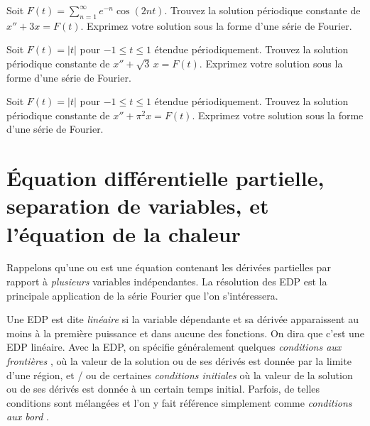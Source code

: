 \begin{exercise}
Soit $F(t) = \sum_{n=1}^\infty e^{-n} \cos(2 n t)$.
Trouvez la solution périodique constante de $x'' + 3 x = F(t)$.
Exprimez votre solution sous la forme d'une série de Fourier.
\end{exercise}

\begin{exercise}
Soit $F(t) = \lvert t \rvert$ pour $-1 \leq t \leq 1$ étendue périodiquement.
Trouvez la solution périodique constante de $x'' + \sqrt{3}\, x = F(t)$.
Exprimez votre solution sous la forme d'une série de Fourier.
\end{exercise}

\begin{exercise}
Soit $F(t) = \lvert t \rvert$ pour $-1 \leq t \leq 1$ étendue périodiquement.
Trouvez la solution périodique constante de $x'' + \pi^2 x = F(t)$.
Exprimez votre solution sous la forme d'une série de Fourier.
\end{exercise}



\sectionnewpage
\section{Équation différentielle partielle, separation de variables, et l'équation de la chaleur}
\label{heateq:section}


Rappelons qu'une \emph{} ou
\emph{} est une équation contenant les dérivées partielles
par rapport à \emph{plusieurs} variables indépendantes. La résolution des EDP
est la  principale application de la série Fourier que l'on s'intéressera.

Une EDP est dite  \emph{linéaire} si la variable dépendante et sa dérivée apparaissent au moins à la première puissance et dans aucune des fonctions. On dira que c'est une EDP linéaire. Avec la EDP\@,
on spécifie généralement quelques
\emph{conditions aux frontières },
où la valeur de la solution ou de ses dérivés est donnée par
la limite d'une région, et / ou de
certaines
\emph{conditions initiales } 
où la valeur
de la solution ou de ses dérivés est donnée à un certain temps initial.
Parfois, de telles conditions sont mélangées et l'on y fait référence
simplement comme
\emph{conditions aux bord }.

